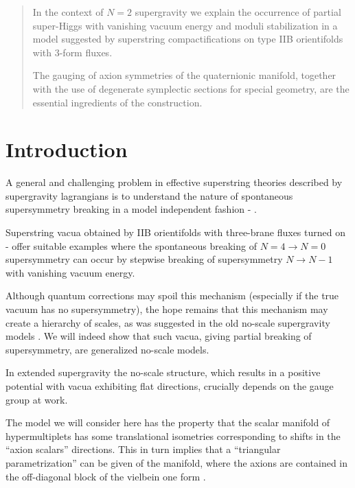 \documentclass[a4paper,12pt]{article}
\begin{document}
\vskip 3cm

\begin{abstract}
In the context of $N=2$ supergravity we explain the occurrence of partial super-Higgs with vanishing vacuum energy and
moduli stabilization  in a model suggested by superstring compactifications on type IIB orientifolds with 3-form fluxes.

The gauging of axion symmetries of the quaternionic manifold, together with the use of degenerate symplectic sections
for special geometry, are the essential ingredients of the construction.

\end{abstract}


 \vfill\eject


\section{Introduction}

A general and challenging problem in effective superstring theories described by supergravity lagrangians is to 
understand the nature of spontaneous supersymmetry breaking in a model independent fashion \cite{ps} - \cite{adfl1}.

Superstring vacua obtained by IIB orientifolds with three-brane fluxes turned on \cite{drs} - \cite{fm}
 offer suitable examples where the spontaneous
breaking of $N=4 \to N=0$ supersymmetry can occur by stepwise breaking of supersymmetry $N \to N-1$ 
with vanishing vacuum energy.

Although quantum corrections may spoil this mechanism \cite{bbhl} (especially if the true vacuum has no supersymmetry), 
the hope remains that this mechanism may create a hierarchy of scales, as was suggested in the old no-scale supergravity models
 \cite{cfkn,elnt}.
We will indeed show that such vacua, giving partial breaking of supersymmetry, are generalized no-scale models.

In extended supergravity the no-scale structure, which results in a positive potential with vacua exhibiting flat directions,
crucially depends on the gauge group at work.

The model we will consider here has the  property that the scalar manifold of hypermultiplets has some translational isometries 
corresponding to shifts in the ``axion scalars'' directions.
This in turn implies that a ``triangular parametrization'' can be given of the manifold, where the axions are 
contained in the off-diagonal block of the vielbein one form \cite{fgp,tz,zino}.
\end{document}
